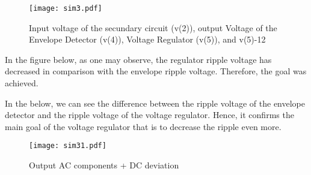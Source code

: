 \begin{figure}[h] \centering
\texttt{[image: sim3.pdf]}
\caption{Input voltage of the secundary circuit (v(2)), output Voltage of the Envelope Detector (v(4)), Voltage Regulator (v(5)), and v(5)-12}
\label{fig:sim5}
\end{figure}

In the figure below, as one may observe, the regulator ripple voltage has decreased in comparison with the envelope ripple voltage. Therefore, the goal was achieved.


In the below, we can see the difference between the ripple voltage of the envelope detector and the ripple voltage of the voltage regulator. Hence, it confirms the main goal of the voltage regulator that is to decrease the ripple even more. 
\begin{figure}[h] \centering
\texttt{[image: sim31.pdf]}
\caption{Output AC components + DC deviation}
\label{fig:sim5}
\end{figure}


